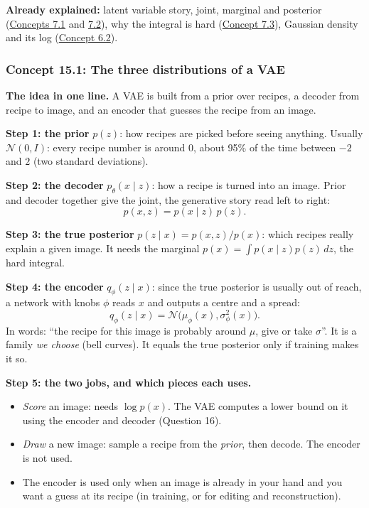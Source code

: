 \documentclass[12pt,a4paper]{article}
\begin{document}
\textbf{Already explained:} latent variable story, joint, marginal and posterior (\hyperref[c7-1]{Concepts 7.1} and \hyperref[c7-2]{7.2}), why the integral is hard (\hyperref[c7-3]{Concept 7.3}), Gaussian density and its log (\hyperref[c6-2]{Concept 6.2}).

\subsubsection{Concept 15.1: The three distributions of a VAE}\label{c15-1}

\textbf{The idea in one line.} A VAE is built from a prior over recipes, a decoder from recipe to image, and an encoder that guesses the recipe from an image.

\textbf{Step 1: the prior} $p(z)$: how recipes are picked before seeing anything. Usually $\mathcal{N}(0,I)$: every recipe number is around 0, about 95\% of the time between $-2$ and $2$ (two standard deviations).

\textbf{Step 2: the decoder} $p_\theta(x\mid z)$: how a recipe is turned into an image. Prior and decoder together give the joint, the generative story read left to right:
\[
p(x,z)=p(x\mid z)\,p(z).
\]

\textbf{Step 3: the true posterior} $p(z\mid x)=p(x,z)/p(x)$: which recipes really explain a given image. It needs the marginal $p(x)=\int p(x\mid z)p(z)\,dz$, the hard integral.

\textbf{Step 4: the encoder} $q_\phi(z\mid x)$: since the true posterior is usually out of reach, a network with knobs $\phi$ reads $x$ and outputs a centre and a spread:
\[
q_\phi(z\mid x)=\mathcal{N}\big(\mu_\phi(x),\sigma^2_\phi(x)\big).
\]
In words: ``the recipe for this image is probably around $\mu$, give or take $\sigma$''. It is a family \emph{we choose} (bell curves). It equals the true posterior only if training makes it so.

\textbf{Step 5: the two jobs, and which pieces each uses.}
\begin{itemize}[nosep]
  \item \emph{Score} an image: needs $\log p(x)$. The VAE computes a lower bound on it using the encoder and decoder (Question 16).
  \item \emph{Draw} a new image: sample a recipe from the \emph{prior}, then decode. The encoder is not used.
  \item The encoder is used only when an image is already in your hand and you want a guess at its recipe (in training, or for editing and reconstruction).
\end{itemize}
\end{document}
